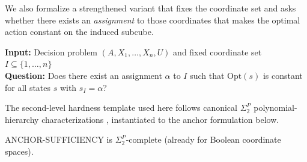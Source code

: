 We also formalize a strengthened variant that fixes the coordinate set and asks whether
there exists an \emph{assignment} to those coordinates that makes the optimal action
constant on the induced subcube.

\begin{problem}
\textbf{Input:} Decision problem $(A, X_1, \ldots, X_n, U)$ and fixed coordinate set $I \subseteq \{1,\ldots,n\}$ \\
\textbf{Question:} Does there exist an assignment $\alpha$ to $I$ such that
$\text{Opt}(s)$ is constant for all states $s$ with $s_I = \alpha$?
\end{problem}

The second-level hardness template used here follows canonical
$\Sigma_2^P$ polynomial-hierarchy characterizations
\cite{papadimitriou1994complexity,arora2009computational}, instantiated to the anchor formulation below.

\begin{theorem}
\label{thm:anchor-sigma2p}
ANCHOR-SUFFICIENCY is $\Sigma_2^P$-complete (already for Boolean coordinate spaces).
\end{theorem}

